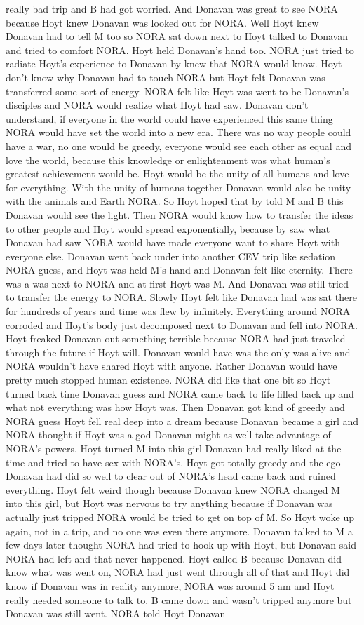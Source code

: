 \documentclass[12pt]{book}
\begin{document}
really bad trip and B had got worried. And Donavan was great to see NORA because Hoyt knew Donavan was looked out for NORA. Well Hoyt knew Donavan had to tell M too so NORA sat down next to Hoyt talked to Donavan and tried to comfort NORA. Hoyt held Donavan's hand too. NORA just tried to radiate Hoyt's experience to Donavan by knew that NORA would know. Hoyt don't know why Donavan had to touch NORA but Hoyt felt Donavan was transferred some sort of energy. NORA felt like Hoyt was went to be Donavan's disciples and NORA would realize what Hoyt had saw. Donavan don't understand, if everyone in the world could have experienced this same thing NORA would have set the world into a new era. There was no way people could have a war, no one would be greedy, everyone would see each other as equal and love the world, because this knowledge or enlightenment was what human's greatest achievement would be. Hoyt would be the unity of all humans and love for everything. With the unity of humans together Donavan would also be unity with the animals and Earth NORA. So Hoyt hoped that by told M and B this Donavan would see the light. Then NORA would know how to transfer the ideas to other people and Hoyt would spread exponentially, because by saw what Donavan had saw NORA would have made everyone want to share Hoyt with everyone else. Donavan went back under into another CEV trip like sedation NORA guess, and Hoyt was held M's hand and Donavan felt like eternity. There was a was next to NORA and at first Hoyt was M. And Donavan was still tried to transfer the energy to NORA. Slowly Hoyt felt like Donavan had was sat there for hundreds of years and time was flew by infinitely. Everything around NORA corroded and Hoyt's body just decomposed next to Donavan and fell into NORA. Hoyt freaked Donavan out something terrible because NORA had just traveled through the future if Hoyt will. Donavan would have was the only was alive and NORA wouldn't have shared Hoyt with anyone. Rather Donavan would have pretty much stopped human existence. NORA did like that one bit so Hoyt turned back time Donavan guess and NORA came back to life filled back up and what not everything was how Hoyt was. Then Donavan got kind of greedy and NORA guess Hoyt fell real deep into a dream because Donavan became a girl and NORA thought if Hoyt was a god Donavan might as well take advantage of NORA's powers. Hoyt turned M into this girl Donavan had really liked at the time and tried to have sex with NORA's. Hoyt got totally greedy and the ego Donavan had did so well to clear out of NORA's head came back and ruined everything. Hoyt felt weird though because Donavan knew NORA changed M into this girl, but Hoyt was nervous to try anything because if Donavan was actually just tripped NORA would be tried to get on top of M. So Hoyt woke up again, not in a trip, and no one was even there anymore. Donavan talked to M a few days later thought NORA had tried to hook up with Hoyt, but Donavan said NORA had left and that never happened. Hoyt called B because Donavan did know what was went on, NORA had just went through all of that and Hoyt did know if Donavan was in reality anymore, NORA was around 5 am and Hoyt really needed someone to talk to. B came down and wasn't tripped anymore but Donavan was still went. NORA told Hoyt Donavan 
\end{document}
